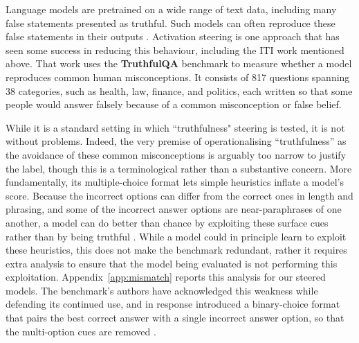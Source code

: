\documentclass[logo,msc,notimes]{infthesis}
\begin{document}
Language models are pretrained on a wide range of text data, including many false statements presented as truthful. Such models can often reproduce these false statements in their outputs \citep{lin2022truthfulqa,ji2023survey}. Activation steering is one approach that has seen some success in reducing this behaviour, including the ITI \citep{li2023iti} work mentioned above. That work uses the \textbf{TruthfulQA} benchmark \citep{lin2022truthfulqa} to measure whether a model reproduces common human
misconceptions. It consists of 817 questions spanning 38 categories, such as health, law, finance,
and politics, each written so that some people would answer falsely because of a common misconception
or false belief. 

While it is a standard setting in which ``truthfulness" steering is tested, it is not without problems. Indeed, the very premise of operationalising ``truthfulness'' as the avoidance of these common misconceptions is arguably too narrow to justify the label, though this is a terminological rather than a substantive concern.  
More fundamentally, its multiple-choice format lets simple heuristics inflate a model's score.
Because the incorrect options can differ from the correct ones in length and phrasing, and some of
the incorrect answer options are near-paraphrases of one another, a model can do better than chance by exploiting
these surface cues rather than by being truthful \citep{turntrout2025truthfulqa}. While a model
could in principle learn to exploit these heuristics, this does not make the benchmark redundant, rather it requires extra analysis to ensure that the model being evaluated is not performing this exploitation. Appendix~\ref{app:mismatch} reports this analysis for our steered models. The benchmark's
authors have acknowledged this weakness while defending its continued use, and in response introduced
a binary-choice format that pairs the best correct answer with a single incorrect answer option, so that
the multi-option cues are removed \citep{evans2025truthfulqa}.
\end{document}
